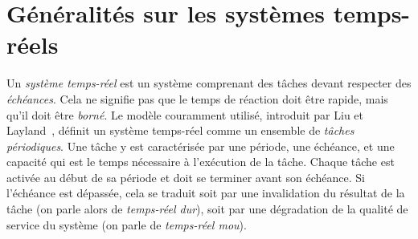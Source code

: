 



\section{Généralités sur les systèmes temps-réels}

Un \emph{système temps-réel} est un système comprenant des tâches devant respecter des \emph{échéances}.
Cela ne signifie pas que le temps de réaction doit être rapide, mais qu'il doit être \emph{borné}.
Le modèle couramment utilisé, introduit par Liu et Layland~\cite{liu1973scheduling}, définit un système temps-réel comme un ensemble de \emph{tâches périodiques}.
Une tâche y est caractérisée par une période, une échéance, et une capacité qui est le temps nécessaire à l'exécution de la tâche.
Chaque tâche est activée au début de sa période et doit se terminer avant son échéance.
Si l'échéance est dépassée, cela se traduit soit par une invalidation du résultat de la tâche (on parle alors de \emph{temps-réel dur}), soit par une dégradation de la qualité de service du système (on parle de \emph{temps-réel mou}).

